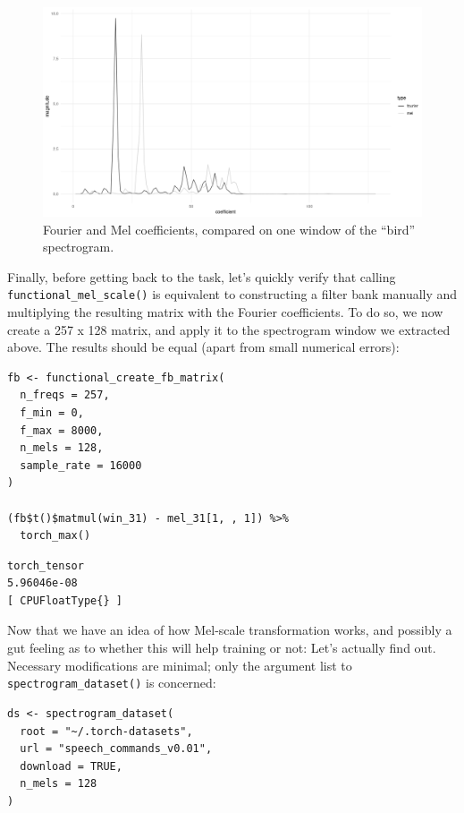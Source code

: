 \documentclass[
  letterpaper,
]{krantz}
\begin{document}
\begin{figure}[H]

{\centering \includegraphics{images/audio-mel-spectrogram.png}

}

\caption{\label{fig-audio-mel-spectrogram}Fourier and Mel coefficients,
compared on one window of the ``bird'' spectrogram.}

\end{figure}

Finally, before getting back to the task, let's quickly verify that
calling \texttt{functional\_mel\_scale()} is equivalent to constructing
a filter bank manually and multiplying the resulting matrix with the
Fourier coefficients. To do so, we now create a 257 x 128 matrix, and
apply it to the spectrogram window we extracted above. The results
should be equal (apart from small numerical errors):

\begin{verbatim}
fb <- functional_create_fb_matrix(
  n_freqs = 257,
  f_min = 0,
  f_max = 8000,
  n_mels = 128,
  sample_rate = 16000
)

(fb$t()$matmul(win_31) - mel_31[1, , 1]) %>%
  torch_max()
\end{verbatim}

\begin{verbatim}
torch_tensor
5.96046e-08
[ CPUFloatType{} ]
\end{verbatim}

Now that we have an idea of how Mel-scale transformation works, and
possibly a gut feeling as to whether this will help training or not:
Let's actually find out. Necessary modifications are minimal; only the
argument list to \texttt{spectrogram\_dataset()} is concerned:

\begin{verbatim}
ds <- spectrogram_dataset(
  root = "~/.torch-datasets",
  url = "speech_commands_v0.01",
  download = TRUE,
  n_mels = 128
)
\end{verbatim}
\end{document}
